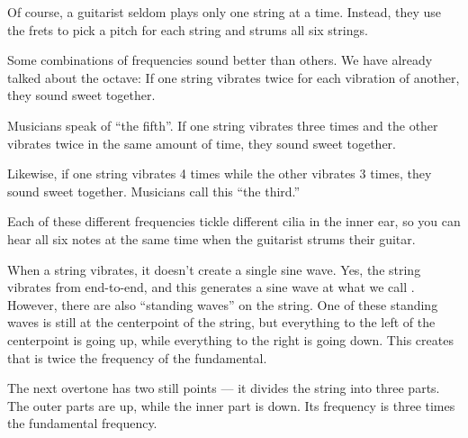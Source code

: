 Of course, a guitarist seldom plays only one string at a
time. Instead, they use the frets to pick a pitch for each string and
strums all six strings.

Some combinations of frequencies sound better than others. We have
already talked about the octave: If one string vibrates twice for each
vibration of another, they sound sweet together.

Musicians speak of ``the fifth''.  If one string vibrates three times
and the other vibrates twice in the same amount of time, they sound
sweet together.

Likewise, if one string vibrates 4 times while the other vibrates 3 times, they
sound sweet together. Musicians call this ``the third.''

Each of these different frequencies tickle different cilia in the
inner ear, so you can hear all six notes at the same time when
the guitarist strums their guitar.

When a string vibrates, it doesn't create a single sine wave. Yes, the
string vibrates from end-to-end, and this generates a sine wave at what
we call . However, there are also
``standing waves'' on the string. One of these standing waves is
still at the centerpoint of the string, but everything to the left of
the centerpoint is going up, while everything to the right is going
down. This creates  that is twice the frequency
of the fundamental.

\begin{center}
    
\end{center}
The next overtone has two still points --- it divides the string into
three parts.  The outer parts are up, while the inner part is
down. Its frequency is three times the fundamental frequency.

